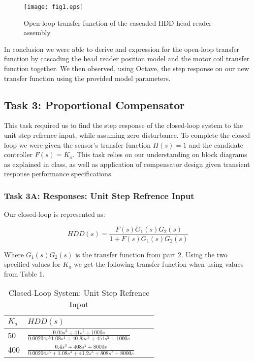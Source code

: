 \documentclass{article}
\begin{document}
\begin{figure}[H]
  \caption{Open-loop transfer function of the cascaded HDD head reader
    assembly}
  \centering
  \texttt{[image: fig1.eps]}
\end{figure}

In conclusion we were able to derive and expression for the open-loop
transfer function by cascading the head reader position model and the
motor coil transfer function together. We then observed, using Octave,
the step response on our new transfer function using the provided
model parameters.

\subsection*{Task 3: Proportional Compensator}

This task required us to find the step response of the closed-loop system to
the unit step refrence input, while assuming zero disturbance. To complete the
closed loop we were given the sensor's transfer function $H(s) = 1$ and the
candidate controller $F(s) = K_a$. This task relies on our understanding on
block diagrams as explained in class, as well as application of compensator
design given transient response performance specifications.

\subsubsection*{Task 3A: Responses: Unit Step Refrence Input}


Our closed-loop is represented as: 

$$HDD(s) = \frac{F(s)G_1(s)G_2(s)}{1 + F(s)G_1(s)G_2(s)}$$

Where $G_1(s)G_2(s)$ is the transfer function from part 2. Using the two 
specified values for $K_a$ we get the following transfer function when using
values from Table 1.

\begin{table}[H]
\begin{center}
  \begin{tabular}{ | l | l | l | p{5cm} |}
  \hline
  $K_a$ & $HDD(s)$  \\ \hline
  50 & $\frac{0.05s^3 + 41s^2 + 1000s}{0.00204s^5 1.08s^4 + 40.85 s^3 
  + 451 s^2  + 1000s}$\\ \hline 
  400 & $\frac{0.4s^3 + 408s^2 + 8000s}{0.00204s^5 + 1.08s^4 + 41.2 s^3
  + 808 s^2 + 8000 s}$  \\ \hline
 \end{tabular}
\end{center}
\caption{Closed-Loop System: Unit Step Refrence Input}
\label{table:2}
\end{table}
\end{document}
